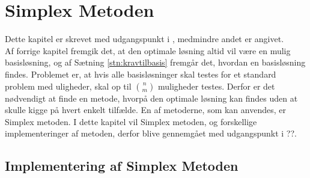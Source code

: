 \chapter{Simplex Metoden}\label{chap:simp}
Dette kapitel er skrevet med udgangspunkt i \citep{bert}, medmindre andet er angivet. \\
Af forrige kapitel fremgik det, at den optimale løsning altid vil være en mulig basisløsning, og af Sætning \ref{stn:kravtilbasis}
fremgår det, hvordan en basisløsning findes. 
Problemet er, at hvis alle basisløsninger skal testes for et standard problem med uligheder, skal op til $\binom{n}{m}$ muligheder testes. 
Derfor er det nødvendigt at finde en metode, hvorpå den optimale løsning kan findes uden at skulle kigge på hvert enkelt tilfælde. 
En af metoderne, som kan anvendes, er Simplex metoden. I dette kapitel vil Simplex metoden, og forskellige implementeringer af metoden, derfor blive gennemgået med udgangspunkt i ??.



\section{Implementering af Simplex Metoden}



